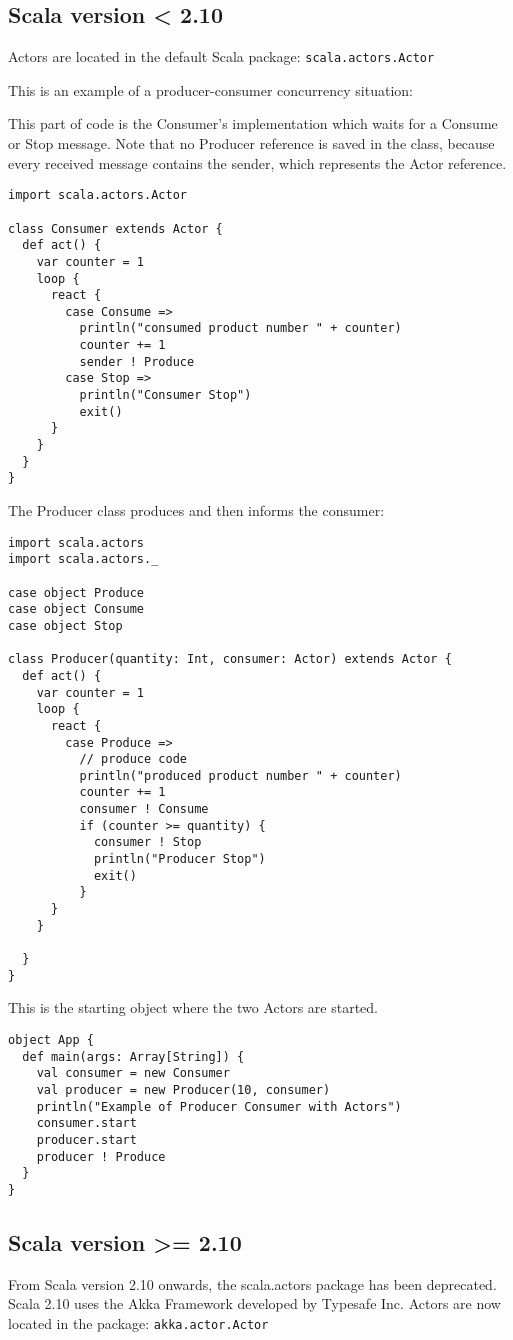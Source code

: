 \documentclass[
	a4paper,					10pt,							twoside,					openright,				notitlepage,			parskip=half,			]{scrreprt}
\begin{document}
\subsection{Scala version < 2.10}
Actors are located in the default Scala package: \verb|scala.actors.Actor|

This is an example of a producer-consumer concurrency situation:

This part of code is the Consumer's implementation which waits for a Consume or Stop message. Note that no Producer
reference is saved in the class, because every received message contains the sender, which represents the Actor reference.
\begin{lstlisting}
import scala.actors.Actor

class Consumer extends Actor {
  def act() {
    var counter = 1
    loop {
      react {
        case Consume =>
          println("consumed product number " + counter)
          counter += 1
          sender ! Produce
        case Stop =>
          println("Consumer Stop")
          exit()
      }
    }
  }
}
\end{lstlisting}
The Producer class produces and then informs the consumer:
\begin{lstlisting}
import scala.actors
import scala.actors._

case object Produce
case object Consume
case object Stop

class Producer(quantity: Int, consumer: Actor) extends Actor {
  def act() {
    var counter = 1
    loop {
      react {
        case Produce =>
          // produce code
          println("produced product number " + counter)
          counter += 1
          consumer ! Consume
          if (counter >= quantity) {
            consumer ! Stop
            println("Producer Stop")
            exit()
          }
      }
    }
    
  }
}
\end{lstlisting}
\newpage
This is the starting object where the two Actors are started.
\begin{lstlisting}
object App {
  def main(args: Array[String]) {
    val consumer = new Consumer
    val producer = new Producer(10, consumer)
    println("Example of Producer Consumer with Actors")
    consumer.start
    producer.start
    producer ! Produce
  }
}
\end{lstlisting}
\subsection{Scala version >= 2.10}
From Scala version 2.10 onwards, the scala.actors package has been deprecated. 
Scala 2.10 uses the Akka Framework developed by Typesafe Inc. 
\cite{typesafe:akkaapi}
Actors are now located in the package: \verb|akka.actor.Actor|
\end{document}
